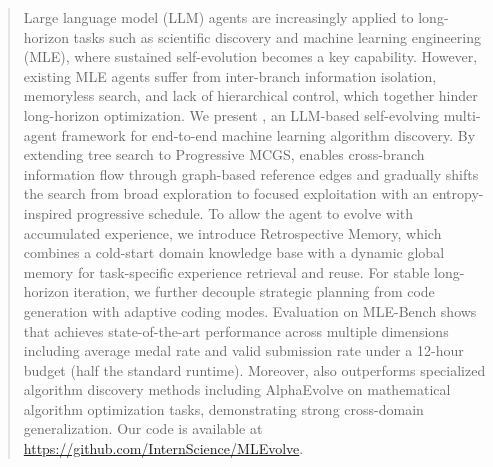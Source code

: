 \begin{abstract}
Large language model (LLM) agents are increasingly applied to long-horizon tasks such as scientific discovery and machine learning engineering (MLE), where sustained self-evolution becomes a key capability. However, existing MLE agents suffer from inter-branch information isolation, memoryless search, and lack of hierarchical control, which together hinder long-horizon optimization.
We present \sname, an LLM-based self-evolving multi-agent framework for end-to-end machine learning algorithm discovery. By extending tree search to Progressive MCGS, \sname enables cross-branch information flow through graph-based reference edges and gradually shifts the search from broad exploration to focused exploitation with an entropy-inspired progressive schedule. To allow the agent to evolve with accumulated experience, we introduce Retrospective Memory, which combines a cold-start domain knowledge base with a dynamic global memory for task-specific experience retrieval and reuse. For stable long-horizon iteration, we further decouple strategic planning from code generation with adaptive coding modes.
Evaluation on MLE-Bench shows that \sname achieves state-of-the-art performance across multiple dimensions including average medal rate and valid submission rate under a 12-hour budget (half the standard runtime). Moreover, \sname also outperforms specialized algorithm discovery methods including AlphaEvolve on mathematical algorithm optimization tasks, demonstrating strong cross-domain generalization. Our code is available at \url{https://github.com/InternScience/MLEvolve}.
\end{abstract}
